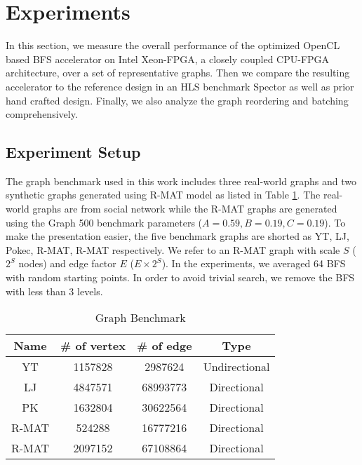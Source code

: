 \section{Experiments} \label{sec:experiment}
In this section, we measure the overall performance of the optimized 
OpenCL based BFS accelerator on Intel Xeon-FPGA, a closely coupled CPU-FPGA
architecture, over a set of representative graphs. Then we compare the 
resulting accelerator to the reference design in an HLS benchmark Spector 
as well as prior hand crafted design. Finally, we also analyze the 
graph reordering and batching comprehensively.

\subsection{Experiment Setup}
The graph benchmark used in this work includes three real-world graphs and 
two synthetic graphs generated using R-MAT model \cite{chakrabarti2004rmat} 
as listed in Table \ref{tab:graph}. The real-world graphs are from social network \cite{yang2012defining, 
leskovec2009community, takac2012data} while the R-MAT graphs are generated 
using the Graph 500 benchmark parameters ($A=0.59, B=0.19, C=0.19$). To make the 
presentation easier, the five benchmark graphs are shorted as YT, 
LJ, Pokec, R-MAT\uppercase\expandafter{}, 
R-MAT\uppercase\expandafter{} respectively. We refer 
to an R-MAT graph with scale $S$ ($2^{S}$ nodes) and edge factor $E$ ($E\times 2^{S}$). 
In the experiments, we averaged 64 BFS with random starting points. 
In order to avoid trivial search, we remove the BFS with less than 3 levels.

\begin{table}
    \centering
  \caption{Graph Benchmark}
  \label{tab:graph}
  \begin{tabular}{cccc}
    \toprule
      Name & \# of vertex & \# of edge & Type \\
    \midrule
      YT \cite{yang2012defining} & 1157828 & 2987624 & Undirectional \\
      LJ \cite{leskovec2009community} & 4847571 & 68993773 & Directional \\
      PK \cite{takac2012data} & 1632804 & 30622564 & Directional \\
      R-MAT\uppercase\expandafter{\romannumeral1} & 524288 & 16777216 & Directional \\
      R-MAT\uppercase\expandafter{\romannumeral2} & 2097152 & 67108864 & Directional \\
  \bottomrule
\end{tabular}
\vspace{-1em}
\end{table}

